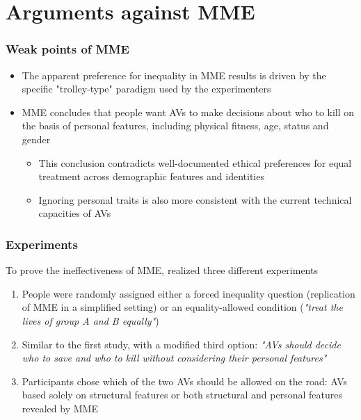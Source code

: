 \documentclass[aspectratio=169]{beamer}
\begin{document}
\section{Arguments against MME}
\begin{frame}
    \frametitle{Weak points of MME}
    \begin{itemize}
        \item The apparent preference for inequality in MME results is driven by the specific "trolley-type" paradigm used by the experimenters
        \item MME concludes that people want AVs to make decisions about who to kill on the basis of personal features, including physical fitness, age, status and gender
        \begin{itemize}
            \item This conclusion contradicts well-documented ethical preferences for equal treatment across demographic features and identities
            \item Ignoring personal traits is also more consistent with the current technical capacities of AVs
        \end{itemize}
    \end{itemize}
\end{frame}

\begin{frame}
    \frametitle{Experiments}
    To prove the ineffectiveness of MME, \citeauthor{against-mme} realized three different experiments
    \begin{enumerate}
        \item People were randomly assigned either a forced inequality question (replication of MME in a simplified setting) or an equality-allowed condition (\textit{"treat the lives of group A and B equally"})
        \item Similar to the first study, with a modified third option: \textit{"AVs should decide who to save and who to kill without considering their personal features"}
        \item Participants chose which of the two AVs should be allowed on the road: AVs based solely on structural features or both structural and personal features revealed by MME
    \end{enumerate}
\end{frame}
\end{document}
